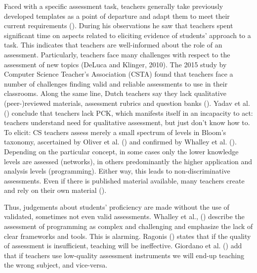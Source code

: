 
Faced with a specific assessment task, teachers generally take previously developed templates as a point of departure and adapt them to meet their current requirements (\cite{hermansen2014reworking}). During his observations he saw that teachers spent significant time on aspects related to eliciting evidence of students' approach to a task. This indicates that teachers are well-informed about the role of an assessment.
Particularly, teachers face many challenges with respect to the assessment of new topics (DeLuca and Klinger, 2010). The 2015 study by Computer Science Teacher's Association (CSTA) found that teachers face a number of challenges finding valid and reliable assessments to use in their classrooms. Along the same line, Dutch teachers say they lack qualitative (peer-)reviewed materials, assessment rubrics and question banks (\cite{tolboom2014informatica}). Yadav et al. (\cite{Yadav2015}) conclude that teachers lack PCK, which manifests itself in an incapacity to act: teachers understand need for qualitative assessment, but just don't know how to. To elicit: CS teachers assess merely a small spectrum of levels in Bloom's taxonomy, ascertained by Oliver et al. (\cite{Oliver2004}) and confirmed by Whalley et al. (\cite{Whalley2006}). Depending on the particular concept, in some cases only the lower knowledge levels are assessed (networks), in others predominantly the higher application and analysis levels (programming). Either way, this leads to non-discriminative assessments. Even if there is published material available, many teachers create and rely on their own material (\cite{popham2009assessment}).

Thus, judgements about students' proficiency are made without the use of validated, sometimes not even valid assessments. Whalley et al., (\cite{Whalley2006}) describe the assessment of programming as complex and challenging and emphasize the lack of clear frameworks and tools. This is alarming. Ragonis (\cite{ragonis2012type}) states that if the quality of assessment is insufficient, teaching will be ineffective.  Giordano et al. (\cite{Giordano2015}) add that if teachers use low-quality assessment instruments we will end-up teaching the wrong subject, and vice-versa.


